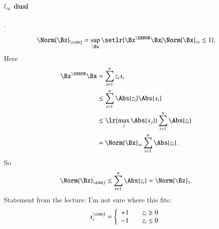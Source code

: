\paragraph{\( l_\infty \) dual}.

%
\begin{equation}\label{eqn:convex-optimizationLecture2:244}
\Norm{\Bz}_\conj
=
\sup_\Bx \setlr{ \Bz^\T \Bx | \Norm{\Bx}_\infty \le 1 }.
\end{equation}
%
Here
\begin{equation}\label{eqn:convex-optimizationLecture2:264}
\begin{aligned}
\Bz^\T \Bx
&= \sum_{i=1}^n z_i x_i \\
&\le \sum_{i=1}^n \Abs{z_i}\Abs{ x_i } \\
&\le \lr{ \max_j \Abs{ x_j } } \sum_{i=1}^n \Abs{z_i} \\
&= \Norm{\Bx}_\infty \sum_{i=1}^n \Abs{z_i}.
\end{aligned}
\end{equation}
%
So
\begin{equation}\label{eqn:convex-optimizationLecture2:284}
\Norm{\Bz}_\conj
\le
\sum_{i=1}^n \Abs{z_i}
=
\Norm{\Bz}_1.
\end{equation}
%
Statement from the lecture: I'm not sure where this fits:
%
\begin{equation}\label{eqn:convex-optimizationLecture2:304}
x_i^\conj
=
\left\{
\begin{array}{l l}
+1 & \quad \mbox{\( z_i \ge 0 \)} \\
-1 & \quad \mbox{\( z_i \le 0 \)}
\end{array}
\right.
\end{equation}
%

